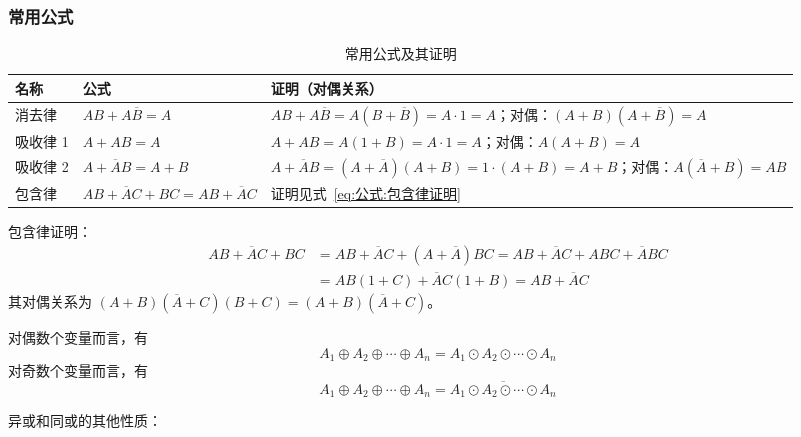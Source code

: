 \subsubsection{常用公式}

\begin{table}[H]
\centering
\caption{常用公式及其证明}
\label{tab:公式:常用公式}
\begin{tabular}{p{1.8cm}p{4.4cm}p{7.6cm}}
	\toprule
	名称 & 公式 & 证明（对偶关系） \\
	\midrule
	消去律 & $AB+A\overline{B}=A$ & $AB+A\overline{B}=A(B+\overline{B})=A\cdot1=A$；对偶：$(A+B)(A+\overline{B})=A$ \\
	吸收律 1 & $A+AB=A$ & $A+AB=A(1+B)=A\cdot1=A$；对偶：$A(A+B)=A$ \\
	吸收律 2 & $A+\overline{A}B=A+B$ & $A+\overline{A}B=(A+\overline{A})(A+B)=1\cdot(A+B)=A+B$；对偶：$A(\overline{A}+B)=AB$ \\
	包含律 & $AB+\overline{A}C+BC=AB+\overline{A}C$ & 证明见式~\eqref{eq:公式:包含律证明} \\
	\bottomrule
\end{tabular}
\end{table}

包含律证明：
\begin{equation}
	\begin{aligned}
		AB+\overline{A}C+BC
		&=AB+\overline{A}C+(A+\overline{A})BC
		=AB+\overline{A}C+ABC+\overline{A}BC\\
		&=AB(1+C)+\overline{A}C(1+B)=AB+\overline{A}C
	\end{aligned}
	\label{eq:公式:包含律证明}
\end{equation}
其对偶关系为 $(A+B)(\overline{A}+C)(B+C)=(A+B)(\overline{A}+C)$。

\begin{definition}[异或和同或运算的性质]
\label{def:异或同或性质}
对偶数个变量而言，有
\begin{equation}
	A_1\oplus A_2\oplus\cdots\oplus A_n=A_1\odot A_2\odot\cdots\odot A_n
	\label{eq:公式:偶数个变量}
\end{equation}
对奇数个变量而言，有
\begin{equation}
	A_1\oplus A_2\oplus\cdots\oplus A_n=\overline{A_1\odot A_2\odot\cdots\odot A_n}
	\label{eq:公式:奇数个变量}
\end{equation}
\end{definition}

异或和同或的其他性质：

